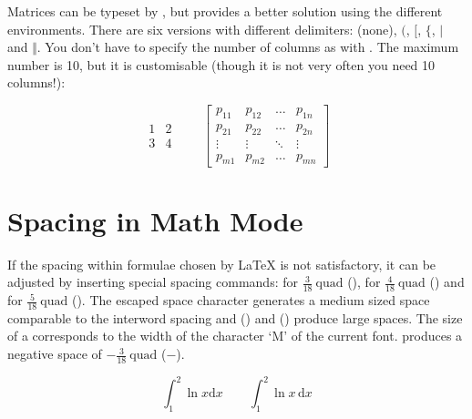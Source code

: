 Matrices can be typeset by , but
 provides a better solution using the different 
environments. There are six versions with different delimiters: 
(none),  $($,  $[$,  $\{$,  $\vert$ and
 $\Vert$. You don't have to specify the number of columns as with
. The maximum number is 10, but it is customisable (though it is not
very often you need 10 columns!):
\begin{example}
\begin{equation*}
  \begin{matrix} 
    1 & 2 \\
    3 & 4 
  \end{matrix} \qquad
  \begin{bmatrix} 
    p_{11} & p_{12} & \ldots 
    & p_{1n} \\
    p_{21} & p_{22} & \ldots 
    & p_{2n} \\
    \vdots & \vdots & \ddots 
    & \vdots \\
    p_{m1} & p_{m2} & \ldots 
    & p_{mn} 
  \end{bmatrix}
\end{equation*}
\end{example}

\section{Spacing in Math Mode}\label{sec:math-spacing}%
If the spacing within formulae chosen by \LaTeX{}
is not satisfactory, it can be adjusted by inserting special spacing
commands: \csi{,} for $\frac{3}{18}\:\textrm{quad}$
(\demowidth{0.166em}), \csi{:} for $\frac{4}{18}\: \textrm{quad}$
(\demowidth{0.222em}) and \csi{;} for $\frac{5}{18}\: \textrm{quad}$
(\demowidth{0.277em}).  The escaped space character \csi{\textvisiblespace}
generates a medium sized space comparable to the interword spacing and
 (\demowidth{1em}) and  (\demowidth{2em}) produce
large spaces. The size of a  corresponds to the width of the
character `M' of the current font. \csi{!} produces a
negative space of $-\frac{3}{18}\:\textrm{quad}$
($-$\demowidth{0.166em}).

\begin{example}
\begin{equation*}
  \int_1^2 \ln x \mathrm{d}x 
  \qquad
  \int_1^2 \ln x \,\mathrm{d}x
\end{equation*}
\end{example}

